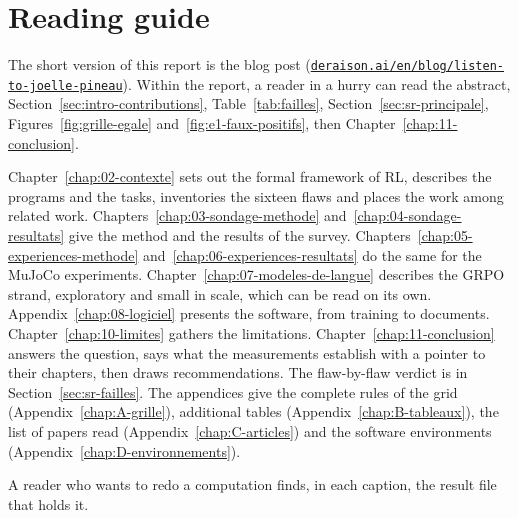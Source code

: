 \section{Reading guide}\label{sec:intro-guide}

The short version of this report is the blog post
(\href{https://deraison.ai/en/blog/listen-to-joelle-pineau}{\texttt{deraison.ai/en/blog/listen-to-joelle-pineau}}).
Within the report, a reader in a hurry can read the abstract, Section~\ref{sec:intro-contributions},
Table~\ref{tab:failles}, Section~\ref{sec:sr-principale}, Figures~\ref{fig:grille-egale}
and~\ref{fig:e1-faux-positifs}, then Chapter~\ref{chap:11-conclusion}.

Chapter~\ref{chap:02-contexte} sets out the formal framework of RL, describes the programs and the
tasks, inventories the sixteen flaws and places the work among related work.
Chapters~\ref{chap:03-sondage-methode} and~\ref{chap:04-sondage-resultats} give the method and the
results of the survey. Chapters~\ref{chap:05-experiences-methode} and~\ref{chap:06-experiences-resultats}
do the same for the MuJoCo experiments. Chapter~\ref{chap:07-modeles-de-langue} describes the GRPO
strand, exploratory and small in scale, which can be read on its own. Appendix~\ref{chap:08-logiciel} presents the software, from training to documents.
Chapter~\ref{chap:10-limites} gathers the limitations. Chapter~\ref{chap:11-conclusion} answers the
question, says what the measurements establish with a pointer to their chapters, then draws
recommendations.
The flaw-by-flaw verdict is in Section~\ref{sec:sr-failles}. The appendices give the complete rules of the grid (Appendix~\ref{chap:A-grille}),
additional tables (Appendix~\ref{chap:B-tableaux}), the list of papers read
(Appendix~\ref{chap:C-articles}) and the software environments (Appendix~\ref{chap:D-environnements}).

A reader who wants to redo a computation finds, in each caption,
the result file that holds it.
